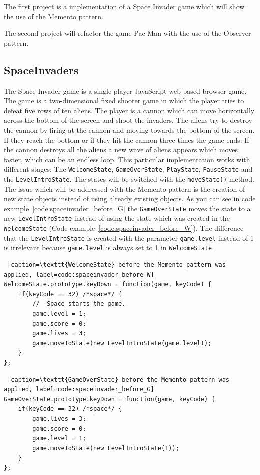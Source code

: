 \documentclass{bioinfo}
\begin{document}
The first project is a implementation of a Space Invader game which will show the use of the Memento pattern.

The second project will refactor the game Pac-Man with the use of the Observer pattern.


\subsection{SpaceInvaders}
The Space Invader game is a single player JavaScript web based browser game. \cite{spaceinv} The game is a two-dimensional fixed shooter game in which the player tries to defeat five rows of ten aliens. The player is a cannon which can move horizontally across the bottom of the screen and shoot the invaders. The aliens try to destroy the cannon by firing at the cannon and moving towards the bottom of the screen. If they reach the bottom or if they hit the cannon three times the game ends. If the cannon destroys all the aliens a new wave of aliens appears which moves faster, which can be an endless loop. \cite{wiki:spaceinvader}       
This particular implementation works with different stages: The \texttt{WelcomeState}, \texttt{GameOverState}, \texttt{PlayState}, \texttt{PauseState} and the \texttt{LevelIntroState}. The states will be switched with the \texttt{moveState()} method.
The issue which will be addressed with the Memento pattern is the creation of new state objects instead of using already existing objects. As you can see in code example~\ref{code:spaceinvader_before_G} the \texttt{GameOverState} moves the state to a new \texttt{LevelIntroState} instead of using the state which was created in the \texttt{WelcomeState} (Code example~\ref{code:spaceinvader_before_W}). The difference that the \texttt{LevelIntroState} is created with the parameter \texttt{game.level} instead of 1 is irrelevant because \texttt{game.level} is always set to 1 in \texttt{WelcomeState}.

\begin{lstlisting} [caption=\texttt{WelcomeState} before the Memento pattern was applied, label=code:spaceinvader_before_W]
WelcomeState.prototype.keyDown = function(game, keyCode) {
    if(keyCode == 32) /*space*/ {
        //  Space starts the game.
        game.level = 1;
        game.score = 0;
        game.lives = 3;
        game.moveToState(new LevelIntroState(game.level));
    }
};
\end{lstlisting}

\begin{lstlisting} [caption=\texttt{GameOverState} before the Memento pattern was applied, label=code:spaceinvader_before_G]
GameOverState.prototype.keyDown = function(game, keyCode) {
    if(keyCode == 32) /*space*/ {
        game.lives = 3;
        game.score = 0;
        game.level = 1;
        game.moveToState(new LevelIntroState(1));
    }
};
\end{lstlisting}
\end{document}
